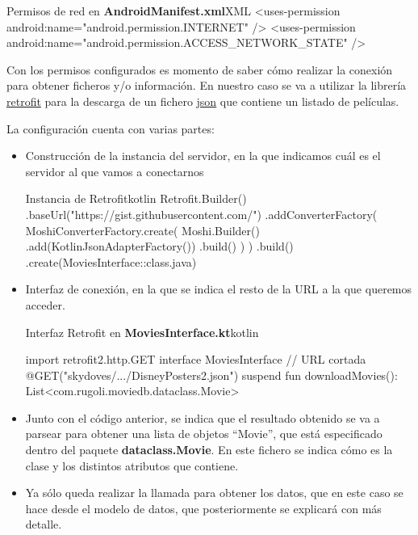 \documentclass{\ClassPath/viu-tfm-template}
\begin{document}
\begin{mycode}{Permisos de red en \textbf{AndroidManifest.xml}}{XML}{{\small }}
<uses-permission android:name="android.permission.INTERNET" />
<uses-permission android:name="android.permission.ACCESS_NETWORK_STATE" />
\end{mycode}

Con los permisos configurados es momento de saber cómo realizar la conexión para obtener ficheros y/o información. En nuestro caso se va a utilizar la librería \href{https://github.com/square/retrofit}{retrofit} para la descarga de un fichero \href{https://gist.githubusercontent.com/skydoves/176c209dbce4a53c0ff9589e07255f30/raw/6489d9712702e093c4df71500fb822f0d408ef75/DisneyPosters2.json}{json} que contiene un listado de películas.

La configuración cuenta con varias partes:
\begin{itemize}
    \item Construcción de la instancia del servidor, en la que indicamos cuál es el servidor al que vamos a conectarnos
    \begin{mycode}{Instancia de Retrofit}{kotlin}{}
Retrofit.Builder()
    .baseUrl("https://gist.githubusercontent.com/")
    .addConverterFactory(
        MoshiConverterFactory.create(
            Moshi.Builder()
              .add(KotlinJsonAdapterFactory())
              .build()
        )
    )
    .build()
    .create(MoviesInterface::class.java)
    \end{mycode}

    \item Interfaz de conexión, en la que se indica el resto de la URL a la que queremos acceder.
    \begin{mycode}{Interfaz Retrofit en \textbf{MoviesInterface.kt}}{kotlin}{}

import retrofit2.http.GET
interface MoviesInterface {
    // URL cortada
    @GET("skydoves/.../DisneyPosters2.json")
    suspend fun downloadMovies():
        List<com.rugoli.moviedb.dataclass.Movie>
}
\end{mycode}

    \item Junto con el código anterior, se indica que el resultado obtenido se va a parsear para obtener una lista de objetos “Movie”, que está especificado dentro del paquete \textbf{dataclass.Movie}. En este fichero se indica cómo es la clase y los distintos atributos que contiene.

    \item Ya sólo queda realizar la llamada para obtener los datos, que en este caso se hace desde el modelo de datos, que posteriormente se explicará con más detalle.
\end{itemize}
\end{document}
